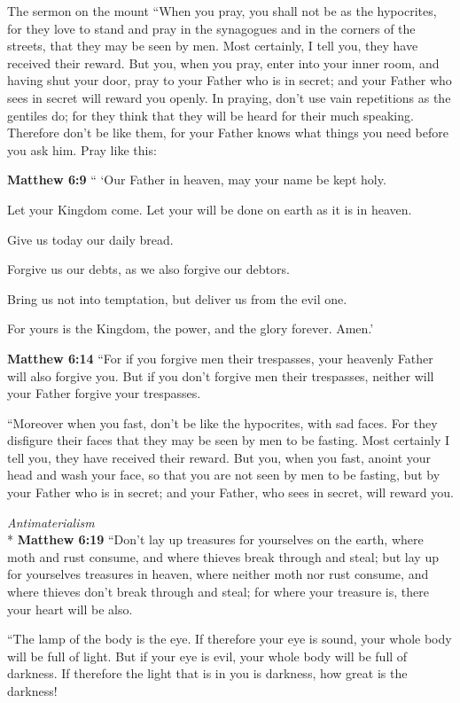 \documentclass[10pt,twoside]{article} %
\newcommand{\doimage}[2]{\texttt{[image: \#2]}\label{fig:#2}}
\newcommand{\figbasic}[4]{ %
    \ifthenelse{\isodd{\pageref{fig:#2}}}{}{\hfill}
    \ifstrempty{#3}{
      \doimage{#1}{#2}
    }{
      \makebox{\doimage{#1}{#2} \\ #3}
    }
    \ifthenelse{\isodd{\pageref{fig:#2}}}{\hfill}{}
    \par
}
\newcommand{\fig}[2][0.4]{
  \figbasic{#1}{#2}{}{}
}
\newcommand{\quotesize}{\normalsize{}}
\newenvironment{quotetext}{\begingroup\quotesize}{\endgroup}
\newcommand{\intex}[1]{\index[texts]{#1}}
\newcommand{\bible}[2]{\begin{quotetext}\textbf{#1}\intex{#1} #2\end{quotetext}}
\newcommand{\matthew}[2]{\bible{Matthew #1}{#2}}
\newcommand{\subhead}[1]{\emph{#1}\\*}
\begin{document}
\begin{section}{The sermon on the mount}
{   ``When you pray, you shall not be as the hypocrites, for they love to stand and pray in the synagogues and in the corners of the streets, that they may be seen by men. Most certainly, I tell you, they have received their reward.    But you, when you pray, enter into your inner room, and having shut your door, pray to your Father who is in secret; and your Father who sees in secret will reward you openly.    In praying, don't use vain repetitions as the gentiles do; for they think that they will be heard for their much speaking.    Therefore don't be like them, for your Father knows what things you need before you ask him.    Pray like this:
}

\matthew{6:9}{
`` `Our Father in heaven, may your name be kept holy.

   Let your Kingdom come.
Let your will be done on earth as it is in heaven.

   Give us today our daily bread.

   Forgive us our debts,
as we also forgive our debtors.

   Bring us not into temptation,
but deliver us from the evil one.

For yours is the Kingdom, the power, and the glory forever. Amen.'
}

\matthew{6:14}{
   ``For if you forgive men their trespasses, your heavenly Father will also forgive you.    But if you don't forgive men their trespasses, neither will your Father forgive your trespasses.

   ``Moreover when you fast, don't be like the hypocrites, with sad faces. For they disfigure their faces that they may be seen by men to be fasting. Most certainly I tell you, they have received their reward.    But you, when you fast, anoint your head and wash your face,    so that you are not seen by men to be fasting, but by your Father who is in secret; and your Father, who sees in secret, will reward you.}

\fig{mammon}

\subhead{Antimaterialism}
\matthew{6:19}{
   ``Don't lay up treasures for yourselves on the earth, where moth and rust consume, and where thieves break through and steal;    but lay up for yourselves treasures in heaven, where neither moth nor rust consume, and where thieves don't break through and steal;    for where your treasure is, there your heart will be also.

   ``The lamp of the body is the eye. If therefore your eye is sound, your whole body will be full of light.    But if your eye is evil, your whole body will be full of darkness. If therefore the light that is in you is darkness, how great is the darkness!

}
\end{section}
\end{document}
